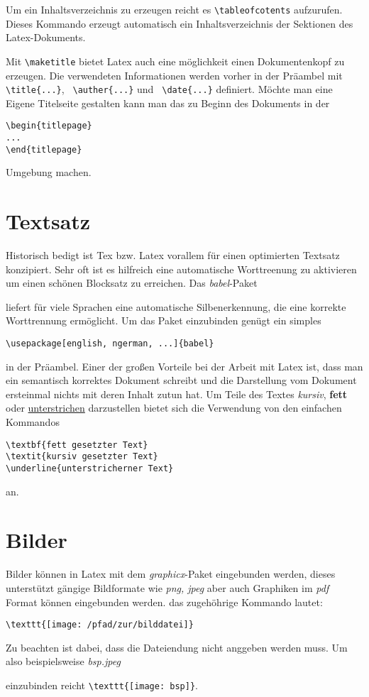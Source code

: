 \documentclass[a4paper, parskip=half]{scrartcl}
\newcommand{\myPackage}[1]{%
  \textit{#1}-Paket%
}
\newcommand{\myFormat}[1]{%
  \textit{#1}%
}
\newcommand{\myPath}[1]{%
  \textit{#1}%
}
\begin{document}
Um ein Inhaltsverzeichnis zu erzeugen reicht es \verb+\tableofcotents+ aufzurufen. Dieses Kommando erzeugt
automatisch ein Inhaltsverzeichnis der Sektionen des Latex-Dokuments.

Mit \verb+\maketitle+ bietet Latex auch eine möglichkeit einen Dokumentenkopf zu erzeugen. Die verwendeten
Informationen werden vorher in der Präambel mit \verb+\title{...}+, \verb+ \auther{...}+ und
\verb+ \date{...}+ definiert. Möchte man eine Eigene Titelseite gestalten kann man das zu Beginn des Dokuments
in der 
\begin{verbatim}
\begin{titlepage}
...
\end{titlepage}
\end{verbatim}
Umgebung machen.

\section{Textsatz}
Historisch bedigt ist Tex bzw. Latex vorallem für einen optimierten Textsatz konzipiert. Sehr oft ist es hilfreich
eine automatische Worttreenung zu aktivieren um einen schönen Blocksatz zu erreichen. Das \myPackage{babel}
liefert für viele Sprachen eine automatische Silbenerkennung, die eine korrekte Worttrennung ermöglicht. Um
das Paket einzubinden genügt ein simples
\begin{verbatim}
\usepackage[english, ngerman, ...]{babel} 
\end{verbatim}
in der Präambel. Einer der großen Vorteile bei der Arbeit mit Latex ist, dass man ein semantisch korrektes
Dokument schreibt und die Darstellung vom Dokument ersteinmal nichts mit deren Inhalt zutun hat. Um Teile
des Textes \textit{kursiv}, \textbf{fett} oder \underline{unterstrichen} darzustellen bietet sich die Verwendung 
von den einfachen Kommandos 
\begin{verbatim}
\textbf{fett gesetzter Text}
\textit{kursiv gesetzter Text}
\underline{unterstricherner Text}
\end{verbatim}
an. 

\section{Bilder}
Bilder können in Latex mit dem \myPackage{graphicx} eingebunden werden, dieses unterstützt gängige
Bildformate wie \myFormat{png, jpeg} aber auch Graphiken im \myFormat{pdf} Format können eingebunden werden.
das zugehöhrige Kommando lautet:
\begin{verbatim}
\texttt{[image: /pfad/zur/bilddatei]}
\end{verbatim}
Zu beachten ist dabei, dass die Dateiendung nicht anggeben werden muss. Um also beispielsweise \myPath{bsp.jpeg}
einzubinden reicht \verb+\texttt{[image: bsp]}+.
\end{document}
